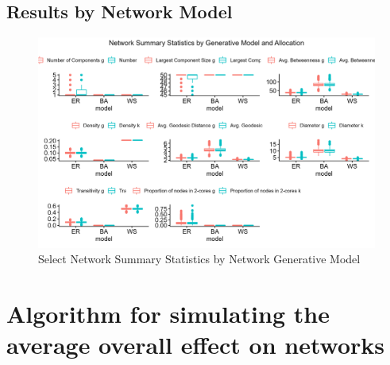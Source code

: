 \documentclass{article}
\theoremstyle{definition}
\begin{document}
\subsection{Results by Network Model}
\begin{figure}[H]
    \centering
    \includegraphics[width=\linewidth]{Original Figures/Network Summary Statistics.png}
    \caption{Select Network Summary Statistics by Network Generative Model}
    \label{fig:Figure B1}
\end{figure}



\newpage
\section{Algorithm for simulating the average overall effect on networks}
\label{Appendix 3}
\end{document}
